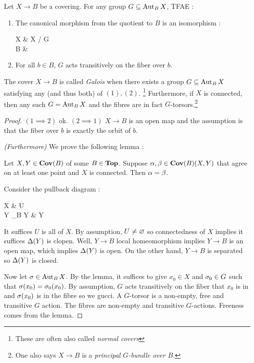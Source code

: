 \documentclass[./main.tex]{subfiles}
\begin{document}
  


\begin{prop}
Let $X \to B$ be a covering. 
For any group $G \subseteq \operatorname{Aut}_B X$, TFAE : 
\begin{enumerate}
  \item The canonical morphism from the quotient to $B$ is an isomorphism : 
  \begin{cd}
    X \ar[d] \ar[r]
      & X / G \ar[ld,"\iso"]\\
    B 
      &
  \end{cd}
  \item For all $b \in B$, 
  $G$ acts transitively on the fiber over $b$.
\end{enumerate}
The cover $X \to B$ is called \emph{Galois}
when there exists a group $G \subseteq \operatorname{Aut}_B X$
satisfying any (and thus both) of $(1), (2)$. 
\footnote{
  These are often also called \emph{normal covers}
}
Furthermore, if $X$ is connected,
then any such $G = \operatorname{Aut}_B X$ and 
the fibres are in fact $G$-torsors.\footnote{
  One also says $X \to B$ is a \emph{principal $G$-bundle over $B$}.
}

\end{prop}
\begin{proof}
  $(1 \implies 2)$ ok.
  $(2 \implies 1)$ $X \to B$ is an open map and the assumption 
  is that the fiber over $b$ is exactly the orbit of $b$.

  \textit{(Furthermore)}
  We prove the following lemma : 
  \begin{lem}[Amazing]
    Let $X, Y \in \mathbf{Cov}(B)$ of some $B \in \mathbf{Top}$.
    Suppose $\alpha, \beta \in \mathbf{Cov}(B)(X,Y)$ that agree on at least one point
    and $X$ is connected.
    Then $\alpha = \beta$.
    \begin{proof1}
      Consider the pullback diagram :  
      \begin{cd}
        X 
          & U  \ar[d]\\
        Y \times_B Y 
          & Y \ar[l,"\De"]
      \end{cd}
      It suffices $U$ is all of $X$.
      By assumption, $U \neq \varnothing$
      so connectedness of $X$ implies it suffices $\Delta(Y)$ is clopen.
      Well, $Y \to B$ local homeomorphism implies 
      $Y \to B$ is an open map, which implies $\Delta(Y)$ is open.
      On the other hand, 
      $Y \to B$ is separated so $\Delta(Y)$ is closed.
    \end{proof1}
  \end{lem}
  
  Now let $\sigma \in \operatorname{Aut}_B X$.
  By the lemma, it suffices to give $x_0 \in X$ and $\sigma_0 \in G$ such that 
  $\sigma(x_0) = \sigma_0(x_0)$.
  By assumption, $G$ acts transitively on the fiber that $x_0$ is in
  and $\sigma(x_0)$ is in the fibre so we gucci. 
  A $G$-torsor is a non-empty, free and transitive $G$ action. 
  The fibres are non-empty and transitive $G$-actions.
  Freeness comes from the lemma. 

\end{proof}
\end{document}
